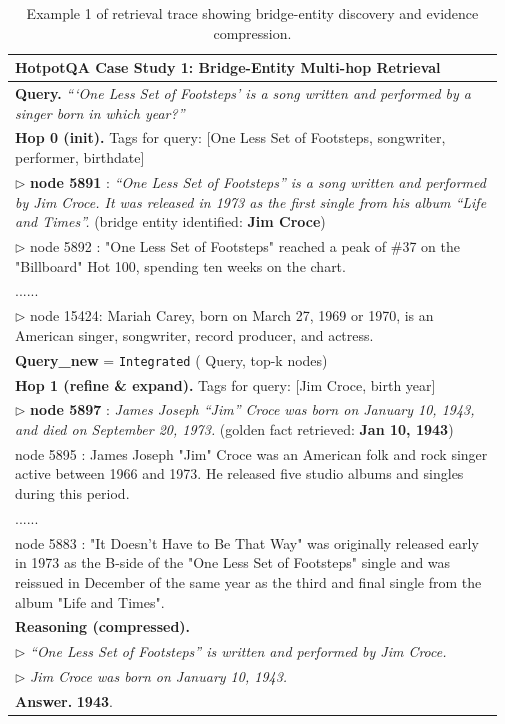 \begin{table}[ht]
\centering
\small
\caption{Example 1 of retrieval trace showing bridge-entity discovery and evidence compression.}
\label{tab:case_hotpotqa_1}

\setlength{\tabcolsep}{8pt}
\renewcommand{\arraystretch}{1.1}
\begin{tabular}{p{0.97\linewidth}}
\toprule
\textbf{HotpotQA Case Study 1: Bridge-Entity Multi-hop Retrieval}\\
\midrule
\textbf{Query.} \emph{``\;`One Less Set of Footsteps' is a song written and performed by a singer born in which year?\;''}\\
\midrule
\textbf{Hop 0 (init).} Tags for query: {[\textcolor{yes}{One Less Set of Footsteps}, \textcolor{no}{songwriter}, \textcolor{no}{performer}, \textcolor{partial}{birthdate}]}\\
\(\triangleright\) \textbf{node 5891} : \emph{``One Less Set of Footsteps'' is a song written and performed by Jim Croce. It was released in 1973 as the first single from his album ``Life and Times''.}   (\textcolor{yes}{bridge entity identified: \textbf{Jim Croce}})\\
\(\triangleright\) node 5892 : "One Less Set of Footsteps" reached a peak of \#37 on the "Billboard" Hot 100, spending ten weeks on the chart.\\
...... \\
\(\triangleright\) node 15424: Mariah Carey, born on March 27, 1969 or 1970, is an American singer, songwriter, record producer, and actress.\\
\midrule
\textbf{Query\_new} = \texttt{Integrated} ( Query, top-k nodes)\\
\midrule
\textbf{Hop 1 (refine \& expand).} Tags for query:  {[\textcolor{yes}{Jim Croce}, \textcolor{yes}{birth year}]}\\
\(\triangleright\) \textbf{node 5897} : \emph{James Joseph ``Jim'' Croce was born on January 10, 1943, and died on September 20, 1973.} (\textcolor{yes}{golden fact retrieved: \textbf{Jan 10, 1943}}) \\
node 5895 : James Joseph "Jim" Croce was an American folk and rock singer active between 1966 and 1973. He released five studio albums and singles during this period. \\
...... \\
node 5883 : "It Doesn't Have to Be That Way" was originally released early in 1973 as the B-side of the "One Less Set of Footsteps" single and was reissued in December of the same year as the third and final single from the album "Life and Times".\\
\midrule
\textbf{Reasoning (compressed).}\\
\(\triangleright\) \emph{``One Less Set of Footsteps'' is written and performed by Jim Croce.}\\
\(\triangleright\) \emph{Jim Croce was born on January 10, 1943.}  \\
\midrule
\textbf{Answer.} \textbf{1943}.\\
\bottomrule

\end{tabular}

\end{table}